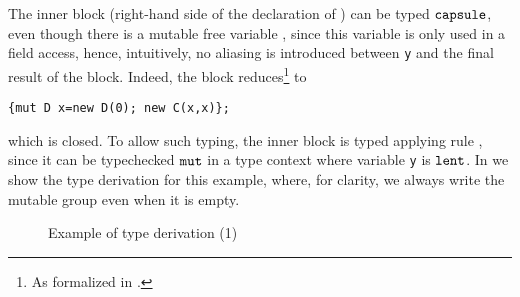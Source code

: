 The inner block (right-hand side of the declaration of \Q@z@) {can} be typed $\texttt{capsule}$, even though there is a mutable free variable \Q@y@, since this variable is only used in a field access, hence, intuitively, no aliasing is introduced between \lstinline{y}{} and the final result of the block. 
Indeed, the block reduces\footnote{As formalized in .} to 
\begin{lstlisting} 
{mut D x=new D(0); new C(x,x)};  
\end{lstlisting}
which is closed.
To allow such typing, the inner block is {typed} applying rule , since it can be typechecked $\texttt{mut}$ in a type context where variable \lstinline{y}{} is $\texttt{lent}$. In  we show the type derivation for this example,
{where, for clarity, we always write the mutable group even when it is empty.}
\begin{figure}[t]
\caption{Example of type derivation (1)}\label{fig:TypingOne}
\end{figure}

